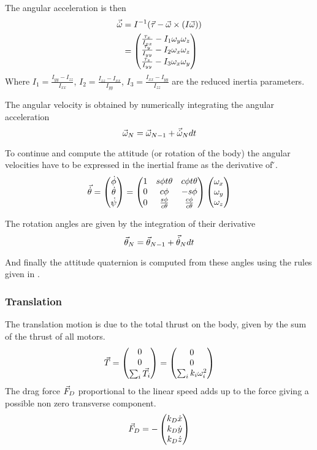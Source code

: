 The angular acceleration is then
\begin{align}
	\vec{\dot{\omega}} &= I^{-1}(\vec{\tau} - \vec{\omega}\times(I\vec{\omega})) \\
	&= \begin{pmatrix}
		\frac{\tau_x}{I_{xx}} - I_1\omega_y\omega_z\\
		\frac{\tau_y}{I_{yy}} - I_2\omega_x\omega_z\\
		\frac{\tau_z}{I_{yy}} - I_3\omega_x\omega_y
	\end{pmatrix}
\end{align}
Where $I_1 = \frac{I_{yy}-I_{zz}}{I_{xx}}$, $I_2 = \frac{I_{zz}-I_{xx}}{I_{yy}}$, $I_3 = \frac{I_{xx}-I_{yy}}{I_{zz}}$
are the reduced inertia parameters.

The angular velocity is obtained by numerically integrating the angular acceleration
\begin{equation}
	\vec{\omega}_N = \vec{\omega}_{N-1} + \vec{\dot{\omega}}_N dt
\end{equation} 

To continue and compute the attitude (or rotation of the body) the angular velocities have to be expressed in the
inertial frame as the derivative of \v{\theta}.
\begin{equation}
	\vec{\dot{\theta}} = \begin{pmatrix}\dot{\phi}\\\dot{\theta}\\\dot{\psi}\end{pmatrix} = \begin{pmatrix}
		1 & s\phi t\theta & c\phi t\theta\\
		0 & c\phi & -s\phi\\ 
		0 & \frac{s\phi}{c\theta} & \frac{c\phi}{c\theta}
	\end{pmatrix}\begin{pmatrix}\omega_x\\\omega_y\\\omega_z\end{pmatrix}
\end{equation}

The rotation angles are given by the integration of their derivative
\begin{equation}
	\vec{\theta}_N = \vec{\theta}_{N-1} + \vec{\dot{\theta}}_N dt
\end{equation}

And finally the attitude quaternion  is computed from these angles using the rules given in .  

\subsubsection{Translation}
The translation motion is due to the total thrust on the body, given
by the sum of the thrust of all motors. 
\begin{equation}\labeleq{bodyThrust}
	\v{T} = \matrix{0\\0\\\sum_{i}{\v{T_i}}} = \matrix{0\\0\\\sum_{i}{k_i\om^2}}
\end{equation}
The drag force $\vec{F}_D$ proportional to the linear speed adds up to the force giving a possible non zero transverse
component.
\begin{equation}
	\vec{F}_D = -\begin{pmatrix}k_D\dot{x}\\k_D\dot{y}\\k_D\dot{z}\end{pmatrix}
\end{equation}

